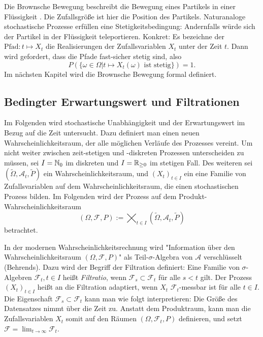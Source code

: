 \begin{bsp}
Die Brownsche Bewegung beschreibt die Bewegung eines Partikels in 
einer Flüssigkeit \cite{webster_bb}. Die Zufallsgröße ist hier die Position des Partikels.
Naturanaloge stochastische Prozesse erfüllen eine Stetigkeitsbedingung: 
Andernfalls würde sich der Partikel in der Flüssigkeit teleportieren. 
Konkret: Es bezeichne der $\text{Pfad}: t \mapsto X_t$ die Realisierungen der Zufallsvariablen $X_t$ unter 
der Zeit $t$. Dann wird gefordert, dass die Pfade fast-sicher stetig sind, also 
$$P(\{\omega \in \Omega | t \mapsto X_t(\omega) \text{ ist stetig}\}) = 1.$$ 
Im nächsten Kapitel wird die Brownsche Bewegung formal definiert.
\end{bsp}

\subsection{Bedingter Erwartungswert und Filtrationen}

Im Folgenden wird stochastische Unabhängigkeit und der Erwartungswert im Bezug auf die Zeit untersucht. 
Dazu definiert man einen neuen Wahrscheinlichkeitsraum, 
der alle möglichen Verläufe des Prozesses vereint. 
Um nicht weiter zwischen zeit-stetigen und -diskreten Prozessen unterscheiden zu müssen, 
sei $I = \Bbb N_0$ im diskreten und $I = \Bbb R_{\ge 0}$ im stetigen Fall. 
Des weiteren sei $(\tilde \Omega, \mathcal A_t, \tilde P)$ ein Wahrscheinlichkeitsraum, 
und $(X_t)_{t \in I}$ ein eine Familie von Zufallsvariablen auf dem Wahrscheinlichkeitsraum, 
die einen stochastischen Prozess bilden. Im Folgenden wird der Prozess 
auf dem Produkt-Wahrscheinlichkeitsraum
$$(\Omega, \mathcal F, P) := \bigtimes_{t \in I}(\tilde \Omega, \mathcal A_t,\tilde P)$$
betrachtet.

\begin{defi}[Adaptiertheit]
In der modernen Wahrscheinlichkeitsrechnung wird "Information über den
Wahrscheinlichkeitsraum $(\Omega, \mathcal F, P)$" als Teil-$\sigma$-Algebra 
von $\mathcal A$ verschlüsselt (Behrends). Dazu wird der Begriff der Filtration 
definiert: Eine Familie von $\sigma$-Algebren $\mathcal F_t, t \in I$ heißt \textit{Filtratio}, 
wenn $\mathcal F_s \subset \mathcal F_t$ für alle $s \lt t$ gilt. 
Der Prozess $(X_t)_{t \in I}$ heißt an die Filtration adaptiert, 
wenn $X_t$ $\mathcal F_t$-messbar ist für alle $t \in I$. Die Eigenschaft 
$\mathcal F_s \subset \mathcal F_t$ kann man wie folgt interpretieren: 
Die Größe des Datensatzes nimmt über die Zeit zu. Anstatt dem Produktraum, kann man 
die Zufallsvariablen $X_t$ somit auf den Räumen $(\Omega, \mathcal F_t, P)$ definieren, 
und setzt $\mathcal F = \lim_{t \to \infty} \mathcal F_t$.

\end{defi}


